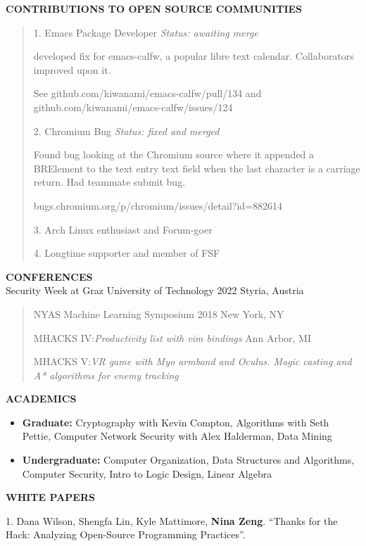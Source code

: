 \documentclass[11pt,a4paper]{article}
\begin{document}
\textbf{CONTRIBUTIONS TO OPEN SOURCE COMMUNITIES}

\begin{quote}
1. Emacs Package Developer \emph{Status: awaiting merge}

\item developed fix for emacs-calfw, a popular libre text calendar.
Collaborators improved upon it.\item  See
github.com/kiwanami/emacs-calfw/pull/134 and
github.com/kiwanami/emacs-calfw/issues/124

2. Chromium Bug \emph{Status: fixed and merged}

\item Found bug looking at the Chromium source where it appended a BRElement
to the text entry text field when the last character is a carriage
return. Had teammate submit bug.

\item bugs.chromium.org/p/chromium/issues/detail?id=882614

3. Arch Linux enthusiast and Forum-goer

4. Longtime supporter and member of FSF
\end{quote}

\textbf{CONFERENCES}\\
Security Week at Graz University of Technology 2022 Styria, Austria

\begin{quote}
NYAS Machine Learning Symposium 2018 New York, NY

MHACKS IV:\emph{Productivity list with vim bindings} Ann Arbor, MI

MHACKS V:\emph{VR game with Myo armband and Oculus. Magic casting and A*
algorithms for enemy tracking}
\end{quote}

\textbf{ACADEMICS}
\begin{itemize}
\item \textbf{Graduate:} Cryptography with Kevin Compton, Algorithms with Seth
Pettie, Computer Network Security with Alex Halderman, Data Mining

\item \textbf{Undergraduate:} Computer Organization, Data Structures and
Algorithms, Computer Security, Intro to Logic Design, Linear Algebra
\end{itemize}

\textbf{WHITE PAPERS}

1. Dana Wilson, Shengfa Lin, Kyle Mattimore, \textbf{Nina Zeng}.
``Thanks for the Hack: Analyzing Open-Source Programming Practices''.
\end{document}
